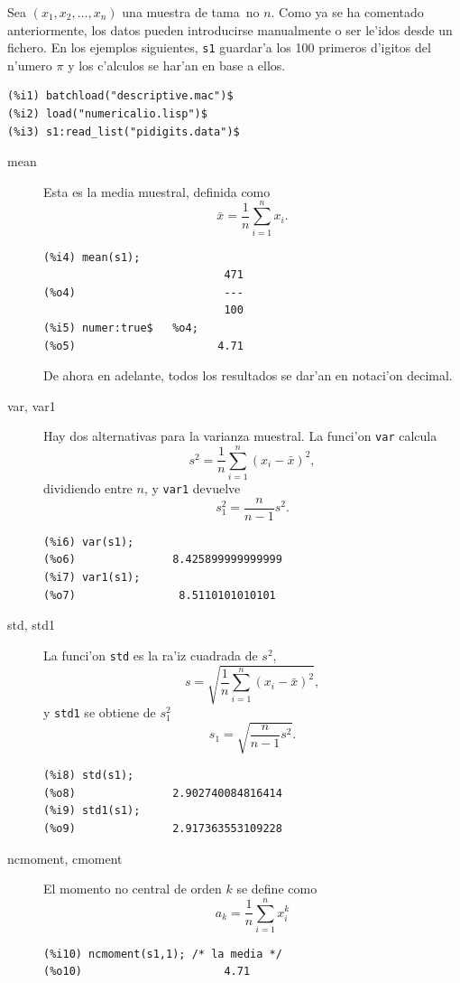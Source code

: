 \documentclass[spanish,12pt,a4paper]{article}
\begin{document}
Sea $(x_1, x_2, \ldots, x_n)$ una muestra de tama~no $n$. Como ya se ha comentado anteriormente, los datos pueden 
introducirse manualmente o ser le'idos desde un fichero. En los ejemplos siguientes, \verb|s1| guardar'a los 100 primeros d'igitos del n'umero $\pi$ y los c'alculos se har'an en base a ellos.

\begin{verbatim}
(%i1) batchload("descriptive.mac")$
(%i2) load("numericalio.lisp")$
(%i3) s1:read_list("pidigits.data")$
\end{verbatim}


\begin{description}

\item[mean] Esta es la media muestral, definida como
\[
\bar{x}=\frac{1}{n} \sum_{i=1}^n x_i.
\]
\begin{verbatim}
(%i4) mean(s1);
                            471
(%o4)                       ---
                            100
(%i5) numer:true$   %o4;
(%o5)                      4.71
\end{verbatim}
De ahora en adelante, todos los resultados se dar'an en notaci'on decimal.

\item[var, var1] Hay dos alternativas para la varianza muestral. La funci'on \verb|var| calcula
\[
s^2=\frac{1}{n} \sum_{i=1}^n (x_i-\bar{x})^2,
\]
dividiendo entre $n$, y \verb|var1| devuelve
\[
s_1^2=\frac{n}{n-1}s^2.
\]
\begin{verbatim}
(%i6) var(s1);
(%o6)               8.425899999999999
(%i7) var1(s1);
(%o7)                8.5110101010101
\end{verbatim}

\item[std, std1] La funci'on \verb|std| es la ra'iz cuadrada de $s^2$,
\[
s=\sqrt{\frac{1}{n} \sum_{i=1}^n (x_i-\bar{x})^2},
\]
y \verb|std1| se obtiene de $s_1^2$
\[
s_1=\sqrt{\frac{n}{n-1}s^2}.
\]
\begin{verbatim}
(%i8) std(s1);
(%o8)               2.902740084816414
(%i9) std1(s1);
(%o9)               2.917363553109228
\end{verbatim}

\item[ncmoment, cmoment] El momento no central de orden $k$ se define como
\[
a_k=\frac{1}{n} \sum_{i=1}^n x_i^k
\]
\begin{verbatim}
(%i10) ncmoment(s1,1); /* la media */
(%o10)                      4.71
\end{verbatim}


\end{description}
\end{document}
